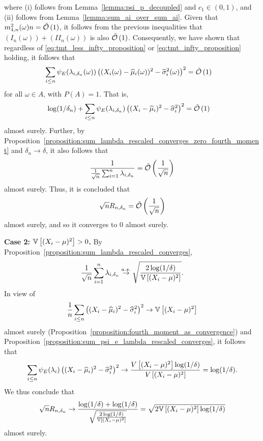    where (i) follows from Lemma~\ref{lemma:psi_p_decoupled} and $c_1 \in (0,1)$, and (ii) follows from Lemma~\ref{lemma:sum_ai_over_sum_ai}. Given that $m_{4, n}^2(\omega) n  = \tilde{\mathcal{O}} \left( 1 \right)$, it follows from the previous inequalities that $(I_n(\omega)) + (II_n(\omega))$ is also $\tilde{\mathcal{O}} \left( 1 \right)$. Consequently, we have shown that regardless of \eqref{eq:tmt_less_infty_proposition} or \eqref{eq:tmt_infty_proposition} holding, it follows that 
    \begin{align*}
        \sum_{i \leq n}\psi_E(\lambda_{i, \delta_n}(\omega)) \left( (X_i(\omega) - \widehat\mu_i(\omega))^2 - \widehat \sigma_i^2 (\omega)\right)^2 &= \tilde{\mathcal{O}} \left( 1 \right)
    \end{align*}
    for all $\omega \in A$, with $P(A) = 1$. That is, 
    \begin{align*}
        \log(1/\delta_n) + \sum_{i \leq n}\psi_E(\lambda_{i, \delta_n}) \left( (X_i - \widehat\mu_i)^2 - \widehat \sigma_i^2 \right)^2 &= \tilde{\mathcal{O}} \left( 1 \right)
    \end{align*}
    almost surely. Further, by Proposition~\ref{proposition:sum_lambda_rescaled_converges_zero_fourth_moment} and $\delta_{n} \to \delta$, it also follows that
     \begin{align*}
        \frac{1}{\frac{1}{\sqrt{n}} \sum_{i = 1}^n \lambda_{i,\delta_{n}}} = \tilde {\mathcal{O}} \left( \frac{1}{\sqrt n} \right)
    \end{align*}
    almost surely. Thus, it is concluded that 
    \begin{align*}
         \sqrt{n} R_{n, \delta_n} = \tilde {\mathcal{O}} \left( \frac{1}{\sqrt n} \right)
    \end{align*}
    almost surely, and so it converges to $0$ almost surely.
    


\textbf{Case 2: $\mathbb{V} \left[ (X_i-\mu)^2\right] > 0$.} 
By Proposition~\ref{proposition:sum_lambda_rescaled_converges},
\begin{align*}
    \frac{1}{\sqrt{n}} \sum_{i = 1}^n \lambda_{i,\delta_{ n}} \stackrel{a.s.}{\to} \sqrt \frac{2 \log (1 / \delta)}{\mathbb{V} \left[ (X_i-\mu)^2\right]}.
\end{align*}
In view of
\begin{align*}
    \frac{1}{n}\sum_{i \leq n}\left( (X_i - \widehat\mu_i)^2 - \widehat \sigma_i^2 \right)^2 \to \mathbb{V} \left[ (X_i-\mu)^2\right]
\end{align*}
almost surely (Proposition~\ref{proposition:fourth_moment_as_convergence}) and Proposition~\ref{proposition:sum_psi_e_lambda_rescaled_converges}, it follows that
\begin{align*}
    \sum_{i \leq n}\psi_E(\lambda_i) \left( (X_i - \widehat\mu_i)^2 - \widehat \sigma_i^2 \right)^2 \to \frac{V \left[ (X_i-\mu)^2\right] \log(1/\delta)}{V \left[ (X_i-\mu)^2\right]} = \log(1/\delta).
\end{align*}
We thus conclude that 
\begin{align*}
    \sqrt{n} R_{n, \delta_n} \to \frac{\log(1/\delta) + \log(1/\delta)}{\sqrt\frac{2 \log (1 / \delta)}{\mathbb{V} \left[ (X_i-\mu)^2\right]}} = \sqrt{ 2\mathbb{V} \left[ (X_i-\mu)^2\right] \log (1 / \delta) }
\end{align*}
almost surely.


